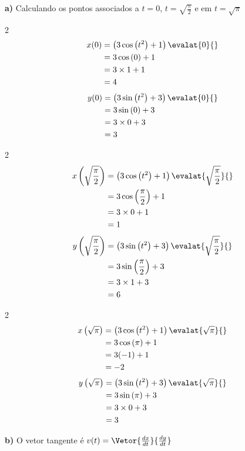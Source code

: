 \documentclass[a4paper,12pt,fleqn]{article}
\begin{document}
\begin{answer}
\textbf{a)} \quad
Calculando os pontos associados a $t=0$, $t=\sqrt{\frac{\pi}{2}}$ e em $t=\sqrt{\pi}$
\begin{multicols}{2}
\begin{align*}
  x(0)
  & = \left(3 \cos\left(t^2\right) +1\right) \evalat{0}{} \\
  & = 3 \cos\left(0\right) +1 \\
  & = 3 \times 1 +1 \\
  & = 4
\end{align*}
\newcolumn
\begin{align*}
  y(0)
  & = \left(3 \sin\left(t^2\right) +3\right) \evalat{0}{} \\
  & = 3 \sin\left(0\right) +3 \\
  & = 3 \times 0 +3 \\
  & = 3
\end{align*}
\end{multicols}

\clearpage
\begin{multicols}{2}
\begin{align*}
  x\left(\sqrt{\frac{\pi}{2}}\right)
  & = \left(3 \cos\left(t^2\right) +1\right) \evalat{\sqrt{\frac{\pi}{2}}}{} \\
  & = 3 \cos\left(\frac{\pi}{2}\right) +1 \\
  & = 3 \times 0 +1 \\
  & = 1
\end{align*}
\newcolumn
\begin{align*}
  y\left(\sqrt{\frac{\pi}{2}}\right)
  & = \left(3 \sin\left(t^2\right) +3\right) \evalat{\sqrt{\frac{\pi}{2}}}{} \\
  & = 3 \sin\left(\frac{\pi}{2}\right) +3 \\
  & = 3 \times 1 +3 \\
  & = 6
\end{align*}
\end{multicols}
\vspace{-\baselineskip}
\begin{multicols}{2}
  \begin{align*}
    x\left(\sqrt{\pi}\right)
    & = \left(3 \cos\left(t^2\right) +1\right) \evalat{\sqrt{\pi}}{} \\
    & = 3 \cos\left(\pi\right) +1 \\
    & = 3 (-1) +1 \\
    & = -2
  \end{align*}
  \newcolumn
  \begin{align*}
    y\left(\sqrt{\pi}\right)
    & = \left(3 \sin\left(t^2\right) +3\right) \evalat{\sqrt{\pi}}{} \\
    & = 3 \sin\left(\pi\right) +3 \\
    & = 3 \times 0 +3 \\
    & = 3
  \end{align*}
\end{multicols}
\vspace{-2\baselineskip}
\textbf{b)} \quad
O vetor tangente é
\(
  v(t) = \Vetor{\frac{dx}{dt}}{\frac{dy}{dt}}
\)


\end{answer}
\end{document}
